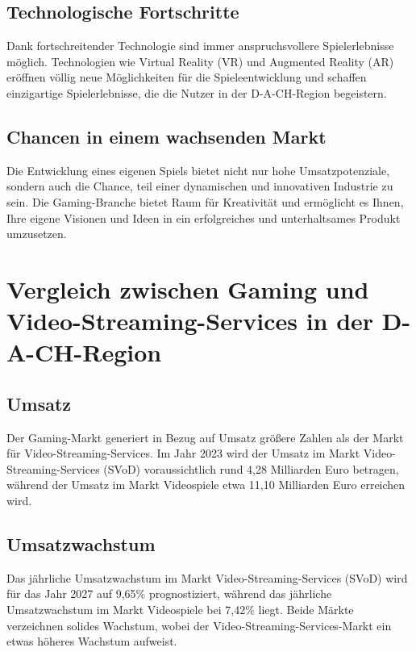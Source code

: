 \subsection{Technologische Fortschritte}
Dank fortschreitender Technologie sind immer anspruchsvollere Spielerlebnisse möglich. Technologien wie Virtual Reality (VR) und Augmented Reality (AR) eröffnen völlig neue Möglichkeiten für die Spieleentwicklung und schaffen einzigartige Spielerlebnisse, die die Nutzer in der D-A-CH-Region begeistern.

\subsection{Chancen in einem wachsenden Markt}
Die Entwicklung eines eigenen Spiels bietet nicht nur hohe Umsatzpotenziale, sondern auch die Chance, teil einer dynamischen und innovativen Industrie zu sein. Die Gaming-Branche bietet Raum für Kreativität und ermöglicht es Ihnen, Ihre eigene Visionen und Ideen in ein erfolgreiches und unterhaltsames Produkt umzusetzen.

\pagebreak

\section{Vergleich zwischen Gaming und Video-Streaming-Services in der D-A-CH-Region}

\subsection{Umsatz}

Der Gaming-Markt generiert in Bezug auf Umsatz größere Zahlen als der Markt für Video-Streaming-Services. Im Jahr 2023 wird der Umsatz im Markt Video-Streaming-Services (SVoD) voraussichtlich rund 4,28 Milliarden Euro betragen, während der Umsatz im Markt Videospiele etwa 11,10 Milliarden Euro erreichen wird.

\subsection{Umsatzwachstum}

Das jährliche Umsatzwachstum im Markt Video-Streaming-Services (SVoD) wird für das Jahr 2027 auf 9,65\%  prognostiziert, während das jährliche Umsatzwachstum im Markt Videospiele bei 7,42\% liegt. Beide Märkte verzeichnen solides Wachstum, wobei der Video-Streaming-Services-Markt ein etwas höheres Wachstum aufweist.

